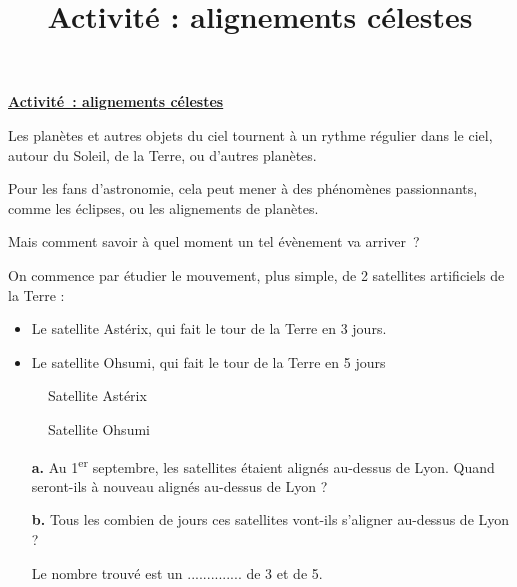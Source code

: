 \documentclass[a4paper,landscape,twocolumn]{article}
\title{Activité : alignements célestes}
\date{}
\begin{document}
\noindent\textbf{\huge \uline{Activité : alignements célestes}}
\vspace{1em}

\begin{mybox}
	Les planètes et autres objets du ciel tournent à un rythme régulier dans le ciel, autour du Soleil, de la Terre, ou d’autres planètes.

	Pour les fans d’astronomie, cela peut mener à des phénomènes passionnants, comme les éclipses, ou les alignements de planètes.

	Mais comment savoir à quel moment un tel évènement va arriver ?
\end{mybox}
\begin{question}
	On commence par étudier le mouvement, plus simple, de 2 satellites artificiels de la Terre :
	\begin{itemize}
		\item Le satellite Astérix, qui fait le tour de la Terre en 3 jours.
		\item Le satellite Ohsumi, qui fait le tour de la Terre en 5 jours
	\end{itemize}

	\begin{figure}[h!]
		\captionsetup{labelformat=empty}
		\begin{floatrow}
			{\caption{Satellite Astérix}}

			{\caption{Satellite Ohsumi}}
		\end{floatrow}
	\end{figure}
	\begin{itemize}
		\item[\textbf{a.}] Au 1\textsuperscript{er} septembre, les satellites étaient alignés au-dessus de Lyon. Quand seront-ils à nouveau alignés au-dessus de Lyon ?
		\item[\textbf{b.}] Tous les combien de jours ces satellites vont-ils s'aligner au-dessus de Lyon ?

		      Le nombre trouvé est un .............. de 3 et de 5.
	\end{itemize}
\end{question}
\end{document}
